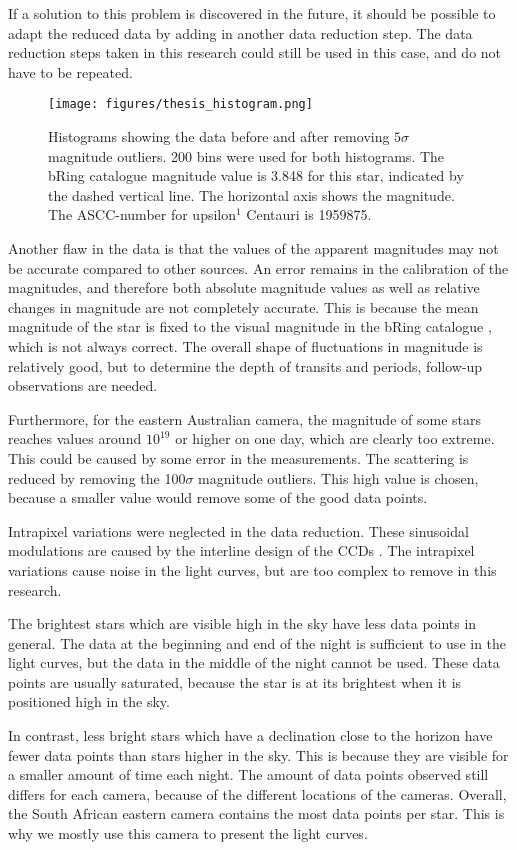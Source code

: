 \documentclass[onecolumn]{aa} %
\begin{document}
If a solution to this problem is discovered in the future, it should be possible to adapt the reduced data by adding in another data reduction step. The data reduction steps taken in this research could still be used in this case, and do not have to be repeated.
\begin{figure}
    \centering
    \texttt{[image: figures/thesis\_histogram.png]}
    \caption{Histograms showing the data before and after removing $5\sigma$ magnitude outliers. 200 bins were used for both histograms. The bRing catalogue magnitude value is 3.848 for this star, indicated by the dashed vertical line. The horizontal axis shows the magnitude. The ASCC-number for upsilon$^1$ Centauri is 1959875.}
    \label{hist}
\end{figure}
Another flaw in the data is that the values of the apparent magnitudes may not be accurate compared to other sources. An error remains in the calibration of the magnitudes, and therefore both absolute magnitude values as well as relative changes in magnitude are not completely accurate.
This is because the mean magnitude of the star is fixed to the visual magnitude in the bRing catalogue \citep{Talens_2018}, which is not always correct. The overall shape of fluctuations in magnitude is relatively good, but to determine the depth of transits and periods, follow-up observations are needed.

Furthermore, for the eastern Australian camera, the magnitude of some stars reaches values around $10^{19}$ or higher on one day, which are clearly too extreme. This could be caused by some error in the measurements. The scattering is reduced by removing the 100$\sigma$ magnitude outliers. This high value is chosen, because a smaller value would remove some of the good data points. 

Intrapixel variations were neglected in the data reduction. These sinusoidal modulations are caused by the interline design of the CCDs \citep{Talens_2018}. The intrapixel variations cause noise in the light curves, but are too complex to remove in this research.

The brightest stars which are visible high in the sky have less data points in general. The data at the beginning and end of the night is sufficient to use in the light curves, but the data in the middle of the night cannot be used. These data points are usually saturated, because the star is at its brightest when it is positioned high in the sky.

In contrast, less bright stars which have a declination close to the horizon have fewer data points than stars higher in the sky. This is because they are visible for a smaller amount of time each night. The amount of data points observed still differs for each camera, because of the different locations of the cameras. Overall, the South African eastern camera contains the most data points per star. This is why we mostly use this camera to present the light curves.
\end{document}
